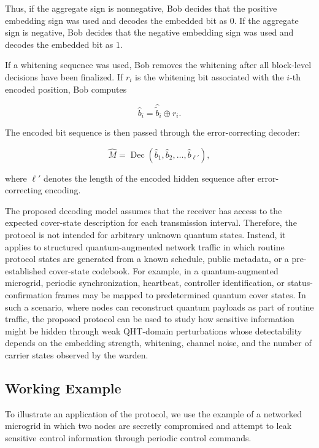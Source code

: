 \documentclass[11pt]{article}
\theoremstyle{plain}
\theoremstyle{definition}
\theoremstyle{remark}
\begin{document}
Thus, if the aggregate sign is nonnegative, Bob decides that the positive embedding sign was used and decodes the embedded bit as $0$. If the aggregate sign is negative, Bob decides that the negative embedding sign was used and decodes the embedded bit as $1$.

If a whitening sequence was used, Bob removes the whitening after all block-level decisions have been finalized. If $r_i$ is the whitening bit associated with the $i$-th encoded position, Bob computes

\begin{equation}
\widehat{b}_i
=
\widehat{\widetilde{b}}_i\oplus r_i.
\end{equation}

The encoded bit sequence is then passed through the error-correcting decoder:

\begin{equation}
\widehat{M}
=
\operatorname{Dec}
\left(
\widehat{b}_1,
\widehat{b}_2,
\ldots,
\widehat{b}_{\ell'}
\right),
\end{equation}

where $\ell'$ denotes the length of the encoded hidden sequence after error-correcting encoding.

The proposed decoding model assumes that the receiver has access to the expected cover-state description for each transmission interval. Therefore, the protocol is not intended for arbitrary unknown quantum states. Instead, it applies to structured quantum-augmented network traffic in which routine protocol states are generated from a known schedule, public metadata, or a pre-established cover-state codebook. For example, in a quantum-augmented microgrid, periodic synchronization, heartbeat, controller identification, or status-confirmation frames may be mapped to predetermined quantum cover states. In such a scenario, where nodes can reconstruct quantum payloads as part of routine traffic, the proposed protocol can be used to study how sensitive information might be hidden through weak QHT-domain perturbations whose detectability depends on the embedding strength, whitening, channel noise, and the number of carrier states observed by the warden.

\subsection{Working Example}
\label{Sec:example}

To illustrate an application of the protocol, we use the example of a networked microgrid in which two nodes are secretly compromised and attempt to leak sensitive control information through periodic control commands.
\end{document}
